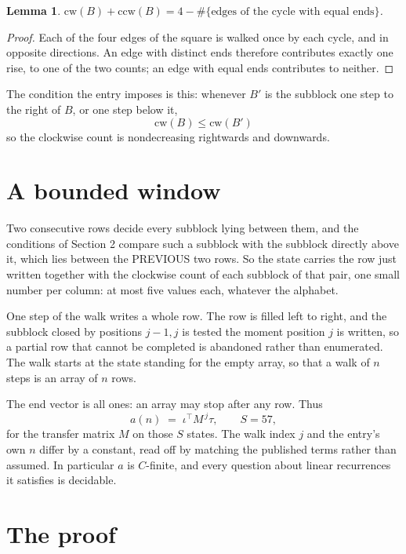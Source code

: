 \documentclass[11pt,a4paper]{article}
\theoremstyle{plain}
\newtheorem{lemma}[theorem]{Lemma}
\theoremstyle{definition}
\begin{document}
\begin{lemma}\label{lem:sum}
$\mathrm{cw}(B)+\mathrm{ccw}(B)=4-\#\{\text{edges of the cycle with equal ends}\}$.
\end{lemma}

\begin{proof}
Each of the four edges of the square is walked once by each cycle, and in opposite directions.
An edge with distinct ends therefore contributes exactly one rise, to one of the two counts;
an edge with equal ends contributes to neither.
\end{proof}

The condition the entry imposes is this: whenever $B'$ is the subblock one step to the right of $B$, or one step below it, 
\[
\mathrm{cw}(B)\le\mathrm{cw}(B')
\]
so the clockwise count is nondecreasing rightwards and downwards.

\section{A bounded window}

Two consecutive rows decide every subblock lying between them, and the conditions of Section 2 compare such a subblock with the subblock directly above it, which lies between the PREVIOUS two rows. So the state carries the row just written together with the clockwise count of each subblock of that pair, one small number per column: at most five values each, whatever the alphabet.

One step of the walk writes a whole row. The row is filled left to right, and the subblock
closed by positions $j-1,j$ is tested the moment position $j$ is written, so a partial row that
cannot be completed is abandoned rather than enumerated. The walk starts at the state standing
for the empty array, so that a walk of $n$ steps is an array of $n$ rows.

The end vector is all ones: an array may stop after any row. Thus
\[
a(n)\;=\;\iota^{\!\top}M^{\,j}\tau ,\qquad S=57,
\]
for the transfer matrix $M$ on those $S$ states. The walk index $j$ and the entry's own $n$
differ by a constant, read off by matching the published terms rather than assumed. In
particular $a$ is $C$-finite, and every question about linear recurrences it satisfies is
decidable.

\section{The proof}
\end{document}
